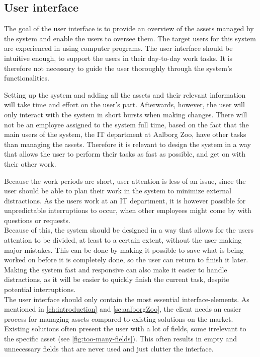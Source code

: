 \subsection{User interface}\label{ssc:UIAnalysis}
The goal of the user interface is to provide an overview of the assets managed by the system and enable the users to oversee them. The target users for this system are experienced in using computer programs. The user interface should be intuitive enough, to support the users in their day-to-day work tasks. It is therefore not necessary to guide the user thoroughly through the system's functionalities.
\par

Setting up the system and adding all the assets and their relevant information will take time and effort on the user's part. Afterwards, however, the user will only interact with the system in short bursts when making changes. There will not be an employee assigned to the system full time, based on the fact that the main users of the system, the IT department at Aalborg Zoo, have other tasks than managing the assets. Therefore it is relevant to design the system in a way that allows the user to perform their tasks as fast as possible, and get on with their other work.
\par
Because the work periods are short, user attention is less of an issue, since the user should be able to plan their work in the system to minimize external distractions. As the users work at an IT department, it is however possible for unpredictable interruptions to occur, when other employees might come by with questions or requests.\\
Because of this, the system should be designed in a way that allows for the users attention to be divided, at least to a certain extent, without the user making major mistakes. This can be done by making it possible to save what is being worked on before it is completely done, so the user can return to finish it later. Making the system fast and responsive can also make it easier to handle distractions, as it will be easier to quickly finish the current task, despite potential interruptions.\\

The user interface should only contain the most essential interface-elements. As mentioned in \autoref{ch:introduction} and \autoref{sc:aalborgZoo}, the client needs an easier process for managing assets compared to existing solutions on the market. Existing solutions often present the user with a lot of fields, some irrelevant to the specific asset (see \autoref{fig:too-many-fields}). This often results in empty and unnecessary fields that are never used and just clutter the interface.


